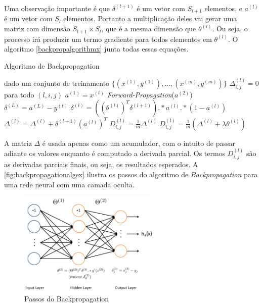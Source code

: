 Uma observação importante é que $\delta^{(l+1)}$ é um vetor com $S_{l+1}$ elementos, e $a^{(l)}$ é um vetor com $S_l$ elementos. Portanto a multiplicação deles vai gerar uma matriz com dimensão $S_{l+1} \times S_l$, que é a mesma dimensão que $\theta^{(l)}$. Ou seja, o processo irá produzir um termo gradiente para todos elementos em $\theta^{(l)}$. O algoritmo \ref{backpropalgorithmx} junta todas essas equações.

\begin{algorithm}[!htb]
\caption{Algoritmo de Backpropagation} \label{backpropalgorithmx}
\begin{algorithmic}
	\State dado um conjunto de treinamento $\{(x^{(1)}, y^{(1)}), \ldots, (x^{(m)}, y^{(m)}) \}$
	\State $\Delta_{i,j}^{(l)} = 0$ para todo $(l, i, j)$
		\State $a^{(1)} = x^{(t)}$
		\State \textit{Forward-Propagation}($a^{(2)}$)
		\State $\delta^{(L)} = a^{(L)} - y^{(t)}$
      \State $\delta^{(l)} = ((\theta^{(l)})^T \delta^{(l+1)}) .* a^{(l)} .* (1 - a^{(l)})$
		  \State $\Delta^{(l)} = \Delta^{(l)} + \delta^{(l+1)}(a^{(l)})^T $
    \EndFor
	\EndFor
			\State $D_{i,j}^{(l)} = \frac{1}{m}\Delta^{(l)}$
		\Else
			\State $D_{i,j}^{(l)} = \frac{1}{m}(\Delta^{(l)} + \lambda\theta^{(l)})$
		\EndIf
\EndProcedure
\end{algorithmic}
\end{algorithm}

A matriz $\Delta$ é usada apenas como um acumulador, com o intuito de passar adiante os valores enquanto é computado a derivada parcial. Os termos $D_{i,j}^{(l)}$ são as derivadas parciais finais, ou seja, os resultados esperados. A \autoref{fig:backpropagationalgex} ilustra os passos do algoritmo de \textit{Backpropagation} para uma rede neural com uma camada oculta.

\begin{figure}[!htb]
\centering
\caption{Passos do Backpropagation} \label{fig:backpropagationalgex}
\includegraphics[width=0.6\textwidth]{img/backpropagationalg}
\end{figure}

